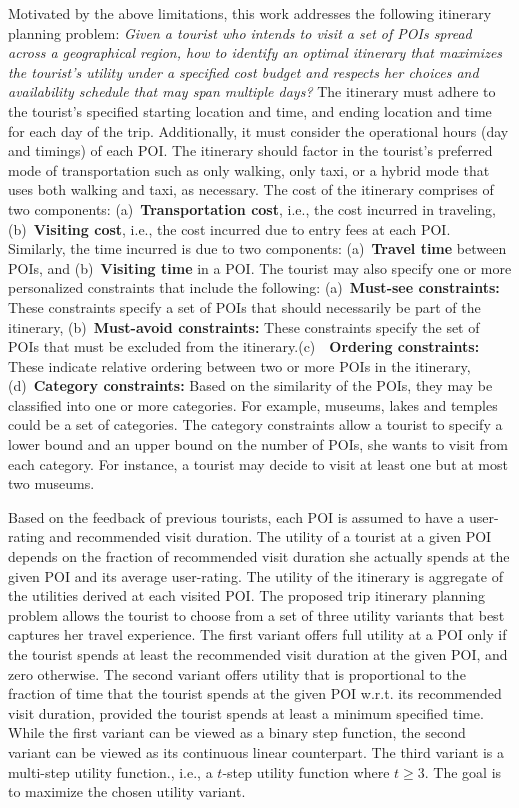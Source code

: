 Motivated by the above limitations, this work addresses the following itinerary planning problem: \emph{Given a tourist who intends to visit a set of POIs spread across a geographical region, how to  identify an optimal itinerary that maximizes the tourist's utility under a specified cost budget and respects her choices and availability schedule that may span multiple days?} The itinerary must adhere to the tourist's specified starting location and time, and ending location and time for each day of the trip. Additionally, it must consider the operational hours (day and timings) of each POI. The itinerary should factor in the tourist's preferred mode of transportation such as only walking, only taxi, or a hybrid mode that uses both walking and taxi, as necessary. The cost of the itinerary comprises of two components: (a)~\textbf{Transportation cost}, i.e., the cost incurred in traveling, (b)~\textbf{Visiting cost}, i.e., the cost incurred due to entry fees at each POI. Similarly, the time incurred is due to two components: (a)~\textbf{Travel time} between POIs, and (b)~\textbf{Visiting time} in a POI. The tourist may also specify one or more personalized constraints that include the following: (a)~\textbf{Must-see constraints:} These constraints specify a set of POIs that should necessarily be part of the itinerary, (b)~\textbf{Must-avoid constraints:} These constraints specify the set of POIs that must be excluded from the itinerary.(c)~~\textbf{Ordering constraints:} These indicate relative ordering between two or more POIs in the itinerary, (d)~\textbf{Category constraints:} Based on the similarity of the POIs, they may be classified into one or more categories. For example, museums, lakes and temples could be a set of categories. The category constraints allow a tourist to specify a lower bound and an upper bound on the number of POIs, she wants to visit from each category. For instance, a tourist may decide to visit at least one but at most two museums. 

Based on the feedback of previous tourists, each POI is assumed to have a user-rating and recommended visit duration. The utility of a tourist at a given POI depends on the fraction of recommended visit duration she actually spends at the given POI and its average user-rating. The utility of the itinerary is aggregate of the utilities derived at each visited POI. The proposed trip itinerary planning problem allows the tourist to choose from a set of three utility variants that best captures her travel experience. The first variant offers full utility at a POI only if the tourist spends at least the recommended visit duration at the given POI, and zero otherwise. The second variant offers utility that is proportional to the fraction of time that the tourist spends at the given POI w.r.t. its recommended visit duration, provided the tourist  spends at least a minimum specified time. While the first variant can be viewed as a binary step function, the second variant can be viewed as its continuous linear counterpart. The third variant is a multi-step utility function., i.e., a $t$-step utility function where $t \ge 3$. The goal is to maximize the chosen utility variant.

